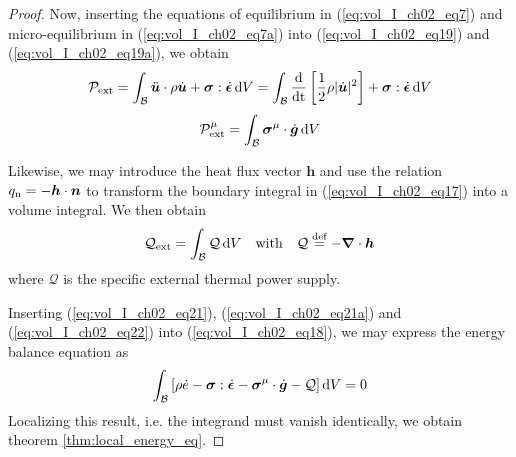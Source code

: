 \begin{proof}
Now, inserting the equations of equilibrium in (\ref{eq:vol_I_ch02_eq7}) 
and micro-equilibrium in (\ref{eq:vol_I_ch02_eq7a})
into (\ref{eq:vol_I_ch02_eq19}) and (\ref{eq:vol_I_ch02_eq19a}), we obtain
\begin{equation}
  {\mathcal P}_{\mathrm{ext}} = 
  \int_{\mathcal{B}}  \ddot{\bm {u}} \cdot \rho \dot{\bm {u}} + \bm{\sigma} : \dot{\bm{\epsilon}} \mathop{}\!\mathrm{d} V =
  \int_{\mathcal{B}}  \frac{\mathrm{d}}{\mathrm{dt}} \left[\frac{1}{2} \rho|\dot{\bm {u}}|^2 \right] + \bm{\sigma} : \dot{\bm{\epsilon}}  \mathop{}\!\mathrm{d} V
\label{eq:vol_I_ch02_eq21}
\end{equation}
\begin{equation}
  {\mathcal P}_{\mathrm{ext}}^{\mathrm{\mu}} = 
  \int_{\mathcal{B}} \bm{\sigma}^{\mathrm{\mu}} \cdot \dot{\bm g} \mathop{}\!\mathrm{d} V
\label{eq:vol_I_ch02_eq21a}
\end{equation}

Likewise, we may introduce the heat flux vector $\bm h$ and use the
relation $q_{\mathrm{n}} = -{\bm h}\cdot \bm{n} $ to transform the
boundary integral in (\ref{eq:vol_I_ch02_eq17}) into a volume
integral. We then obtain 
\begin{equation}
  {\mathcal Q}_{\mathrm{ext}} = \int_{\mathcal{B}}  \mathcal Q \mathop{}\!\mathrm{d} V  \quad
  \mathrm{with}
  \quad {\mathcal Q} \stackrel{\text{def}}{=} - {\bm\nabla} \cdot \bm{h}
       \label{eq:vol_I_ch02_eq22}
\end{equation}
where ${\mathcal Q}$  is the specific external thermal power supply.

Inserting (\ref{eq:vol_I_ch02_eq21}), (\ref{eq:vol_I_ch02_eq21a}) 
and (\ref{eq:vol_I_ch02_eq22})
into (\ref{eq:vol_I_ch02_eq18}), we may express the energy balance
equation as
\begin{equation}
  \int_{\mathcal{B}} \left[ \rho \dot{e} - \bm{\sigma} : \dot{\bm{\epsilon}} - \bm{\sigma}^{\mathrm{\mu}} \cdot \dot{\bm {g}}
   - {\mathcal Q} \right] \mathop{}\!\mathrm{d} V = 0
   \label{eq:vol_I_ch02_eq24}
\end{equation}
Localizing this result, i.e. the integrand must vanish
identically, we obtain theorem \ref{thm:local_energy_eq}.
\end{proof}


